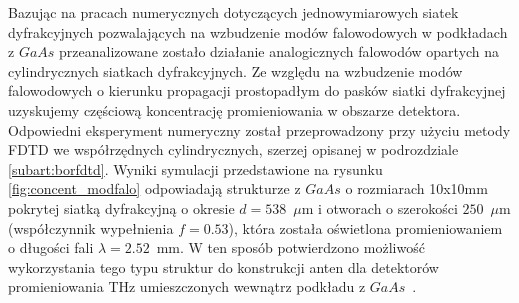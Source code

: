 Bazując na pracach numerycznych dotyczących  jednowymiarowych siatek dyfrakcyjnych pozwalających na wzbudzenie modów falowodowych w podkładach z $GaAs$ przeanalizowane zostało działanie analogicznych falowodów opartych na cylindrycznych siatkach dyfrakcyjnych. Ze względu na wzbudzenie modów falowodowych o kierunku propagacji prostopadłym do pasków siatki dyfrakcyjnej uzyskujemy częściową koncentrację promieniowania w obszarze detektora. Odpowiedni eksperyment numeryczny został przeprowadzony przy użyciu metody FDTD we współrzędnych cylindrycznych, szerzej opisanej w podrozdziale \ref{subart:borfdtd}. Wyniki symulacji przedstawione na rysunku \ref{fig:concent_modfalo} odpowiadają strukturze z $GaAs$ o rozmiarach 10x10mm pokrytej siatką dyfrakcyjną o okresie $d=538$~$\mu$m i otworach o szerokości $250$~$\mu$m (współczynnik wypełnienia $f=0.53$), która została oświetlona promieniowaniem o długości fali $\lambda=2.52$~mm. W ten sposób potwierdzono możliwość wykorzystania tego typu struktur do konstrukcji anten dla detektorów promieniowania THz umieszczonych wewnątrz podkładu z $GaAs$~\cite{Stolarek2011}.

